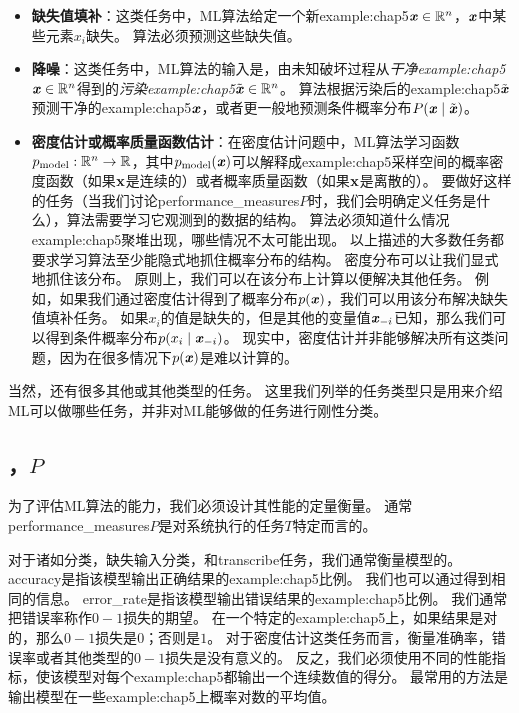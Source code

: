 \begin{itemize}
    \item \textbf{缺失值填补}：这类任务中，\gls{ML}算法给定一个新\gls{example:chap5}$\boldsymbol{\mathit{x}}\in\mathbb{R}^n$，$\boldsymbol{\mathit{x}}$中某些元素$x_i$缺失。
    算法必须预测这些缺失值。


    \item \textbf{降噪}：这类任务中，\gls{ML}算法的输入是，由未知破坏过程从\emph{干净\gls{example:chap5}}$\boldsymbol{\mathit{x}} \in \mathbb{R}^n$得到的\emph{污染\gls{example:chap5}}$\tilde{\boldsymbol{\mathit{x}}} \in \mathbb{R}^n$。
    算法根据污染后的\gls{example:chap5}$\tilde{\boldsymbol{\mathit{x}}}$预测干净的\gls{example:chap5}$\boldsymbol{\mathit{x}}$，或者更一般地预测条件概率分布$P(\boldsymbol{\mathit{x}}\mid\tilde{\boldsymbol{\mathit{x}}})$。
    
    \item \textbf{密度估计}\textbf{或}\textbf{概率质量函数估计}：在密度估计问题中，\gls{ML}算法学习函数$p_{\text{model}}:\mathbb{R}^n \to \mathbb{R}$，其中$p_{\text{model}}(\boldsymbol{\mathit{x}})$可以解释成\gls{example:chap5}采样空间的概率密度函数（如果$\mathbf{x}$是连续的）或者概率质量函数（如果$\mathbf{x}$是离散的）。
    要做好这样的任务（当我们讨论\gls{performance_measures}$P$时，我们会明确定义任务是什么），算法需要学习它观测到的数据的结构。
    算法必须知道什么情况\gls{example:chap5}聚堆出现，哪些情况不太可能出现。
    以上描述的大多数任务都要求学习算法至少能隐式地抓住概率分布的结构。
    密度分布可以让我们显式地抓住该分布。
    原则上，我们可以在该分布上计算以便解决其他任务。
    例如，如果我们通过密度估计得到了概率分布$p(\boldsymbol{\mathit{x}})$，我们可以用该分布解决缺失值填补任务。
    如果$x_i$的值是缺失的，但是其他的变量值$\boldsymbol{\mathit{x}}_{-i}$已知，那么我们可以得到条件概率分布$p(x_i\mid\boldsymbol{\mathit{x}}_{-i})$。
    现实中，密度估计并非能够解决所有这类问题，因为在很多情况下$p(\boldsymbol{\mathit{x}})$是难以计算的。
\end{itemize}

当然，还有很多其他或其他类型的任务。
这里我们列举的任务类型只是用来介绍\gls{ML}可以做哪些任务，并非对\gls{ML}能够做的任务进行刚性分类。

\subsection{，$P$}
\label{sec:the_performance_measure_p}
为了评估\gls{ML}算法的能力，我们必须设计其性能的定量衡量。
通常\gls{performance_measures}$P$是对系统执行的任务$T$特定而言的。

对于诸如分类，缺失输入分类，和\gls{transcribe}任务，我们通常衡量模型的。
\gls{accuracy}是指该模型输出正确结果的\gls{example:chap5}比例。
我们也可以通过得到相同的信息。
\gls{error_rate}是指该模型输出错误结果的\gls{example:chap5}比例。
我们通常把错误率称作$0-1$损失的期望。
在一个特定的\gls{example:chap5}上，如果结果是对的，那么$0-1$损失是$0$；否则是$1$。
对于密度估计这类任务而言，衡量准确率，错误率或者其他类型的$0-1$损失是没有意义的。
反之，我们必须使用不同的性能指标，使该模型对每个\gls{example:chap5}都输出一个连续数值的得分。
最常用的方法是输出模型在一些\gls{example:chap5}上概率对数的平均值。



